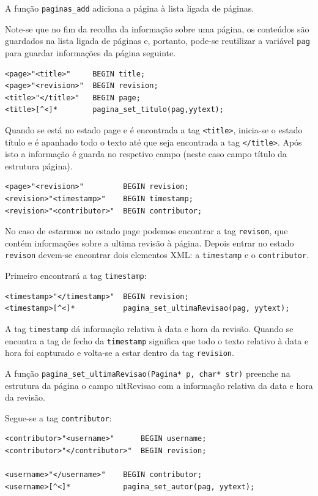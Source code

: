 \documentclass[11pt, a4paper, oneside]{article}
\begin{document}
A função \texttt{paginas\_add} adiciona a página à lista ligada de páginas.

Note-se que no fim da recolha da informação sobre uma página, os conteúdos são guardados na lista ligada de páginas e, portanto, pode-se reutilizar a variável \texttt{pag} para guardar informações da página seguinte.

\begin{verbatim}
<page>"<title>"     BEGIN title;
<page>"<revision>"  BEGIN revision;
<title>"</title>"   BEGIN page;
<title>[^<]*        pagina_set_titulo(pag,yytext);
\end{verbatim}

Quando se está no estado page e é encontrada a tag \texttt{<title>}, inicia-se o estado título e é apanhado todo o texto até que seja encontrada a tag \texttt{</title>}. Após isto a informação é guarda no respetivo campo (neste caso campo título da estrutura página).

\begin{verbatim}
<page>"<revision>"         BEGIN revision;
<revision>"<timestamp>"    BEGIN timestamp;
<revision>"<contributor>"  BEGIN contributor;
\end{verbatim}

No caso de estarmos no estado page podemos encontrar a tag \texttt{revison}, que contém informações sobre a ultima revisão à página. Depois entrar no estado \texttt{revison} devem-se encontrar dois elementos XML: a \texttt{timestamp} e o \texttt{contributor}.

Primeiro encontrará a tag \texttt{timestamp}:

\begin{verbatim}
<timestamp>"</timestamp>"  BEGIN revision;
<timestamp>[^<]*           pagina_set_ultimaRevisao(pag, yytext);
\end{verbatim}

A tag \texttt{timestamp} dá informação relativa à data e hora da revisão.
Quando se encontra a tag de fecho da \texttt{timestamp} significa que todo o texto relativo à data e hora foi capturado e volta-se a estar dentro da tag \texttt{revision}.

A função \texttt{pagina\_set\_ultimaRevisao(Pagina* p, char* str)} preenche na estrutura da página o campo ultRevisao com a informação relativa da data e hora da revisão.


Segue-se a tag \texttt{contributor}:

\begin{verbatim}
<contributor>"<username>"      BEGIN username;
<contributor>"</contributor>"  BEGIN revision;

<username>"</username>"    BEGIN contributor;
<username>[^<]*            pagina_set_autor(pag, yytext);
\end{verbatim}
\end{document}
